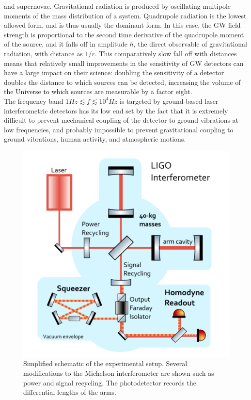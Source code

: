 \documentclass[binding=0.6cm, LaM]{sapthesis}
\begin{document}
        and supernovae.
 	Gravitational radiation is produced by oscillating multipole moments of the mass distribution of a system.
        Quadrupole radiation is the lowest allowed form, and is thus usually the dominant form.
        In this case, the GW field strength is proportional to the second time derivative of the quadrupole moment of the source,
        and it falls off in amplitude $h$, the direct observable of gravitational radiation, with distance as $1/r$.
        This comparatively slow fall off with distances means that relatively small improvements in the sensitivity
        of GW detectors can have a large impact on their science:
        doubling the sensitivity of a detector doubles the distance to which sources can be detected,
        increasing the volume of the Universe to which sources are measurable by a factor eight. \\
	The frequency band $1Hz \apprle f \apprle 10^4 Hz$ is targeted by
        ground-based laser interferometric detectors has its low end set by the fact that it is extremely difficult
        to prevent mechanical coupling of the detector to ground vibrations at low frequencies,
        and probably impossible to prevent gravitational coupling to ground vibrations, human activity, and atmospheric motions.
    \begin{figure}[H]
                \includegraphics[scale=0.5]{interferometer}
                \centering
                \caption{Simplified schematic of the experimental setup.  
			 Several modifications to the Michelson interferometer 
			 are shown such as power and signal recycling. 
			 The photodetector records the differential lengths of the arms. \cite{9}}
                \label{fig:interferometer}
                \end{figure}
\end{document}
